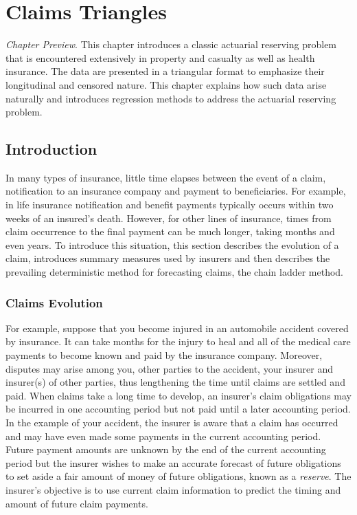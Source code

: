 \setcounter{chapter}{18}
\chapter{Claims Triangles}
{\small \textit{Chapter Preview}.  This chapter introduces a classic
actuarial reserving problem that is encountered extensively in
property and casualty as well as health insurance. The data are
presented in a triangular format to emphasize their longitudinal and
censored nature. This chapter explains how such data arise naturally
and introduces regression methods to address the actuarial reserving
problem.}


\section{Introduction}

In many types of insurance, little time elapses between the event of
a claim, notification to an insurance company and payment to
beneficiaries. For example, in life insurance notification and
benefit payments typically occurs within two weeks of an insured's
death. However, for other lines of insurance, times from claim
occurrence to the final payment can be much longer, taking months
and even years. To introduce this situation, this section describes
the evolution of a claim, introduces summary measures used by
insurers and then describes the prevailing deterministic method for
forecasting claims, the chain ladder method.

\subsection{Claims Evolution}\label{S19:ClaimsEvolution}

For example, suppose that you become injured in an automobile
accident covered by insurance. It can take months for the injury to
heal and all of the medical care payments to become known and paid
by the insurance company. Moreover, disputes may arise among you,
other parties to the accident, your insurer and insurer(s) of other
parties, thus lengthening the time until claims are settled and
paid. When claims take a long time to develop, an insurer's claim
obligations may be incurred in one accounting period but not paid
until a later accounting period. In the example of your accident,
the insurer is aware that a claim has occurred and may have even
made some payments in the current accounting period. Future payment
amounts are unknown by the end of the current accounting period but
the insurer wishes to make an accurate forecast of future
obligations to set aside a fair amount of money of future
obligations, known as a \emph{reserve}. The insurer's objective is
to use current claim information to predict the timing and amount of
future claim payments.

